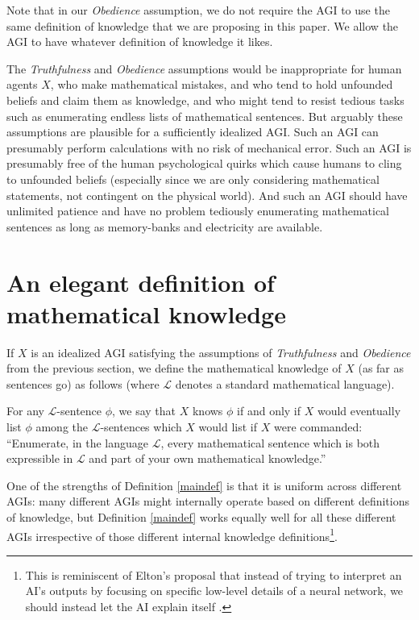 \documentclass[runningheads]{llncs}
\begin{document}
Note that in our \emph{Obedience} assumption, we do not require the AGI to use
the same definition of knowledge that we are proposing in this paper. We allow
the AGI to have whatever definition of knowledge it likes.

The \emph{Truthfulness} and \emph{Obedience} assumptions would be inappropriate
for human agents $X$, who make mathematical
mistakes, and who tend to hold unfounded beliefs and claim them as knowledge,
and who might tend to resist tedious tasks such as enumerating endless lists of
mathematical sentences. But arguably these assumptions are plausible for a
sufficiently idealized AGI. Such an AGI can presumably perform calculations with
no risk of mechanical error. Such an AGI is presumably free of the human
psychological quirks which cause humans to cling to unfounded beliefs (especially
since we are only considering mathematical statements, not contingent on
the physical world). And such an AGI should have unlimited patience and have no
problem tediously enumerating mathematical sentences as long as memory-banks
and electricity are available.


\section{An elegant definition of mathematical knowledge}
\label{mainsection}

If $X$ is an idealized AGI satisfying the assumptions of \emph{Truthfulness}
and \emph{Obedience} from the previous section, we define the mathematical
knowledge of $X$ (as far as sentences go)
as follows (where $\mathscr L$ denotes a standard mathematical
language).

\begin{definition}
\label{maindef}
  For any $\mathscr L$-sentence $\phi$, we say that $X$ knows $\phi$ if and only
  if $X$ would eventually list $\phi$ among the $\mathscr L$-sentences which $X$
  would list if $X$ were commanded:
  ``Enumerate, in the language $\mathscr L$, every mathematical sentence which
  is both expressible in $\mathscr L$ and part of your own mathematical knowledge.''
\end{definition}

One of the strengths of Definition \ref{maindef} is that it is uniform across
different AGIs: many different AGIs might internally operate based on different
definitions of knowledge, but Definition \ref{maindef} works equally well for
all these different AGIs irrespective of those different internal knowledge
definitions\footnote{This is reminiscent of Elton's proposal that instead of
trying to interpret an AI's outputs by focusing on specific low-level details
of a neural network, we should instead let the AI explain itself \cite{elton}.}.
\end{document}
